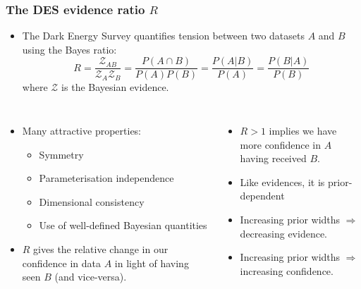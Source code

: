 \documentclass[aspectratio=169]{beamer}
\begin{document}
\begin{frame}
    \frametitle{The DES evidence ratio $R$}
    \begin{itemize}
        \item The Dark Energy Survey  quantifies tension between two datasets $A$ and $B$ using the Bayes ratio:
            \[
                R = \frac{\mathcal{Z}_{AB}}{\mathcal{Z}_A \mathcal{Z}_B} = \frac{P(A\cap B)}{P(A)P(B)} = \frac{P(A|B)}{P(A)} = \frac{P(B|A)}{P(B)}
            \]
            where $\mathcal{Z}$ is the Bayesian evidence.
    \end{itemize}
    \begin{columns}
        \begin{itemize}
            \item Many attractive properties:
                \begin{itemize}
                    \item Symmetry
                    \item Parameterisation independence
                    \item Dimensional consistency
                    \item Use of well-defined Bayesian quantities
                \end{itemize}
            \item $R$ gives the relative change in our confidence in data $A$ in light of having seen $B$ (and vice-versa).
        \end{itemize}
        \begin{itemize}
            \item $R>1$ implies we have more confidence in $A$ having received $B$.
            \item Like evidences, it is prior-dependent
            \item Increasing prior widths $\Rightarrow$ decreasing evidence. 
            \item Increasing prior widths $\Rightarrow$ increasing confidence.
        \end{itemize}
    \end{columns}
\end{frame}
\end{document}
